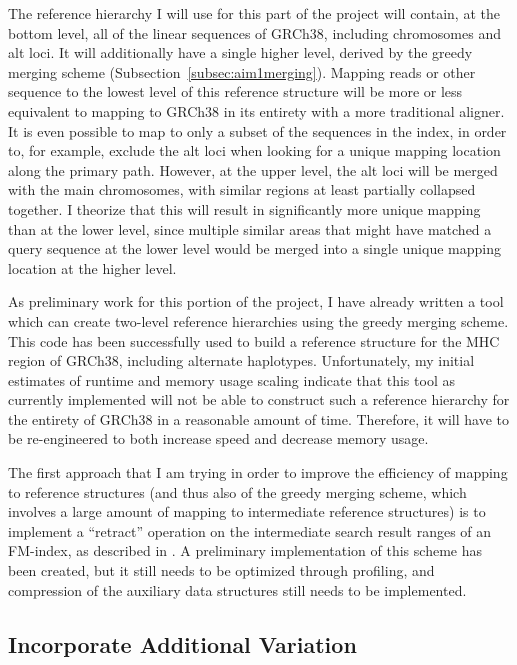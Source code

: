 \documentclass[11pt,proposal]{ucthesis}
\begin{document}
The reference hierarchy I will use for this part of the project will contain, at the bottom level, all of the linear sequences of GRCh38, including chromosomes and alt loci. It will additionally have a single higher level, derived by the greedy merging scheme (Subsection~\ref{subsec:aim1merging}). Mapping reads or other sequence to the lowest level of this reference structure will be more or less equivalent to mapping to GRCh38 in its entirety with a more traditional aligner. It is even possible to map to only a subset of the sequences in the index, in order to, for example, exclude the alt loci when looking for a unique mapping location along the primary path. However, at the upper level, the alt loci will be merged with the main chromosomes, with similar regions at least partially collapsed together. I theorize that this will result in significantly more unique mapping than at the lower level, since multiple similar areas that might have matched a query sequence at the lower level would be merged into a single unique mapping location at the higher level.

As preliminary work for this portion of the project, I have already written a tool which can create two-level reference hierarchies using the greedy merging scheme. This code has been successfully used to build a reference structure for the MHC region of GRCh38, including alternate haplotypes. Unfortunately, my initial estimates of runtime and memory usage scaling indicate that this tool as currently implemented will not be able to construct such a reference hierarchy for the entirety of GRCh38 in a reasonable amount of time. Therefore, it will have to be re-engineered to both increase speed and decrease memory usage.

The first approach that I am trying in order to improve the efficiency of mapping to reference structures (and thus also of the greedy merging scheme, which involves a large amount of mapping to intermediate reference structures) is to implement a ``retract'' operation on the intermediate search result ranges of an FM-index, as described in \cite{fischer2008other}. A preliminary implementation of this scheme has been created, but it still needs to be optimized through profiling, and compression of the auxiliary data structures still needs to be implemented.

\subsection{Incorporate Additional Variation}
\label{subsec:aim2variation}
\end{document}
